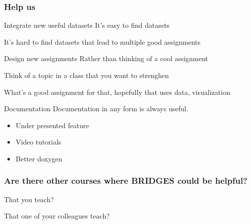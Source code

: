 \documentclass[aspectratio=169]{beamer}
\begin{document}
\begin{frame}
  \frametitle{Help us}
    \begin{block}{Integrate new useful datasets}
      It's easy to find datasets

      It's hard to find datasets that lead to multiple good assignments
    \end{block}

    \begin{block}{Design new assignments}
      Rather than thinking of a cool assignment

      Think of a topic in a class that you want to strenghen

      What's a good assignment for that, hopefully that uses data, visualization      
    \end{block}

    \begin{block}{Documentation}
      Documentation in any form is always useful.
      \begin{itemize}
      \item Under presented feature
      \item Video tutorials
      \item Better doxygen
      \end{itemize}
    \end{block}
\end{frame}

\begin{frame}
  \frametitle{Are there other courses where BRIDGES could be helpful?}
  That you teach?

  That one of your colleagues teach?
\end{frame}
\end{document}
